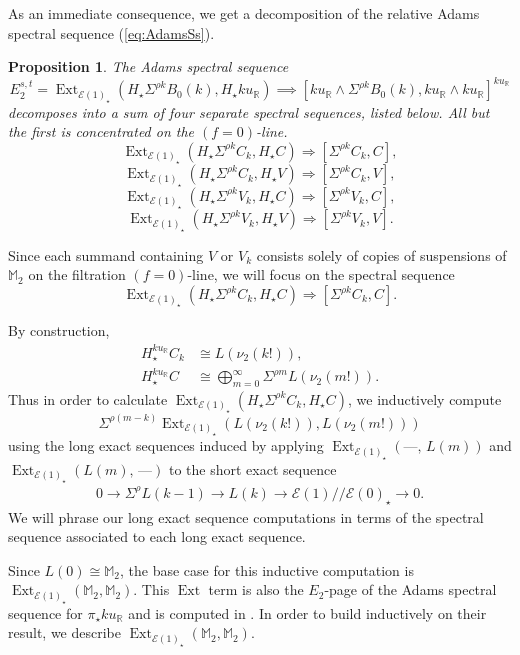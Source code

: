\documentclass{amsart}
\newtheorem{proposition}[equation]{Proposition}
\theoremstyle{plain}
\numberwithin{equation}{section}
\numberwithin{figure}{section}
\DeclareMathOperator{\Ext}{Ext}
\newcommand{\mM}{{\mathbb M}}
\newcommand{\mR}{{\mathbb R}}
\newcommand{\cE}{{\mathcal E}}
\newcommand{\0}{\langle 0 \rangle }
\begin{document}
As an immediate consequence, we get a decomposition of the relative Adams spectral sequence (\ref{eq:AdamsSs}).

\begin{proposition} \label{prop:splitInto4}
   The Adams spectral sequence  
\[
 E_2^{s, t} = \Ext_{\mathcal{E}(1)_\star} \left(H_\star \Sigma^{\rho k} B_0(k), H_\star ku_\mR \right) \implies [ku_\mR \wedge \Sigma^{\rho k} B_{0} (k),ku_\mR \wedge ku_\mR]^{ku_\mR}
\]decomposes into a sum of four separate spectral sequences, listed below. All but the first is concentrated on the $(f=0)$-line.
\[ \Ext_{\cE(1)_{\star}}(H_{\star}\Sigma^{\rho k}C_{k}, H_{\star}C) \Longrightarrow [\Sigma^{\rho k}C_{k}, C], \]
\[ \Ext_{\cE(1)_{\star}}(H_{\star}\Sigma^{\rho k}C_{k}, H_{\star}V) \Longrightarrow [\Sigma^{\rho k}C_{k}, V], \]
\[ \Ext_{\cE(1)_{\star}}(H_{\star}\Sigma^{\rho k}V_{k}, H_{\star}C) \Longrightarrow [\Sigma^{\rho k}V_{k}, C], \]
\[ \Ext_{\cE(1)_{\star}}(H_{\star}\Sigma^{\rho k}V_{k}, H_{\star}V) \Longrightarrow [\Sigma^{\rho k}V_{k}, V] .\]
\end{proposition}

Since each summand containing $V$ or $V_{k}$ consists solely of copies of suspensions of $\mM_{2}$ on the filtration $(f=0)$-line, we will focus on the spectral sequence 
\[ \Ext_{\cE(1)_{\star}}(H_{\star}\Sigma^{\rho k}C_{k}, H_{\star}C) \Longrightarrow [\Sigma^{\rho k}C_{k}, C] .\]

By construction, 
\begin{align*}
    H_{\star}^{ku_{\mR}} C_{k} & \cong L(\nu_{2}(k!)), \\
    H_{\star}^{ku_{\mR}} C & \cong \bigoplus_{m=0}^{\infty}\Sigma^{\rho m}L(\nu_{2}(m!)).
\end{align*}
Thus in order to calculate $\Ext_{\cE(1)_{\star}}(H_{\star}\Sigma^{\rho k}C_{k}, H_{\star}C)$, we inductively compute 
\[
\Sigma^{\rho(m-k)}\Ext_{\mathcal{E}(1)_\star} (L(\nu_2(k!)), L(\nu_2(m!)))
\]
using the long exact sequences induced by applying  $\Ext_{\cE(1)_\star} (\text{---}, \, L(m))$ and \newline $\Ext_{\cE(1)_\star} (L(m), \, \text{---})$ to the short exact sequence
\begin{align} \label{eq:ses}
    0 \to \Sigma^\rho L(k - 1) \to L(k) \to \cE(1)// \cE(0)_\star \to 0.
\end{align}
We will phrase our long exact sequence computations in terms of the spectral sequence associated to each long exact sequence.

Since $L(0) \cong \mM_{2}$, the base case for this inductive computation is $\Ext_{\cE(1)_{\star}}(\mM_{2}, \mM_{2})$. This $\Ext$ term is also the $E_{2}$-page of the Adams spectral sequence for $\pi_{\star}ku_{\mathbb{R}}$ and is computed in \cite{GuillouHillIsaksenRavenel2020}. In order to build inductively on their result, we describe $\Ext_{\cE(1)_{\star}}(\mM_{2}, \mM_{2})$.
\end{document}
